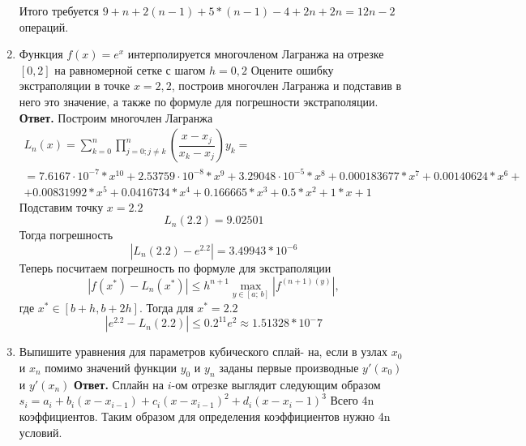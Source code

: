 \documentclass{article}
\begin{document}
\begin{enumerate}
        
        \noindent Итого требуется $9+n+2(n-1)+5*(n-1)-4+2n+2n=12n-2$ операций.
        \item Функция $f(x) = e^x$
        интерполируется многочленом Лагранжа на отрезке $[0, 2]$  на равномерной сетке с шагом $h = 0,2$
        Оцените ошибку экстраполяции в точке $x = 2,2$, построив многочлен Лагранжа и подставив в него это значение,
        а также по формуле для погрешности экстраполяции.
        \newline
        {\bfseries Ответ. } 
        Построим многочлен Лагранжа
        \begin{gather*}
            L_n(x) = \sum_{k=0}^{n} \prod_{j=0; j\neq k}^{n} \left(\dfrac{x-x_j}{x_k-x_j}\right) y_k = \\
            =  7.6167\cdot 10^{-7}*x^{10} + 2.53759\cdot 10^{-8}*x^9 + 3.29048\cdot 10^{-5}*x^8 + 0.000183677*x^7 + 0.00140624*x^6 + \\
            + 0.00831992*x^5 + 0.0416734*x^4 + 0.166665*x^3 + 0.5*x^2 + 1*x + 1
        \end{gather*}
        Подставим точку $x = 2.2$
        \begin{equation*}
            L_n(2.2) = 9.02501
        \end{equation*}
        Тогда погрешность
        \begin{equation*}
            |L_n(2.2) - e^{2.2}| = 3.49943*10^{-6}
        \end{equation*}
        Теперь посчитаем погрешность по формуле для экстраполяции 
        \begin{equation*}
            |f(x^*) - L_n(x^*)| \leqslant h^{n+1} \max_{y \in [a;\, b]} |f^{(n+1)(y)}|,
        \end{equation*}
        где $x^* \in [b + h, b+2h]$.
        Тогда для $x^* = 2.2$
        \begin{equation*}
            |e^{2.2} - L_n(2.2)| \leqslant 0.2^{11} e^2 \approx 1.51328*10^-7
        \end{equation*}
        \item Выпишите уравнения для параметров кубического сплай-
        на, если в узлах $x_0$ и $x_n$ помимо значений функции $y_0$ и $y_n$
        заданы первые производные $y'(x_0)$ и $y'(x_n)$
        \newline 
        {\bfseries Ответ. } 
        Сплайн на $i$-ом отрезке выглядит следующим образом $s_i=a_i+b_i(x-x_{i-1})+c_i(x-x_{i-1})^2+d_i(x-x_i-1)^3$
	Всего 4n коэффициентов. Таким образом для определения коэффициентов нужно 4n условий.
	

\end{enumerate}
\end{document}
